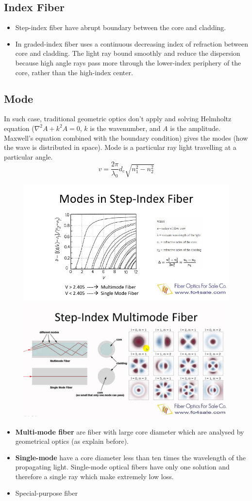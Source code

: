 \documentclass[twocolumn]{article}
\numberwithin{equation}{section}
\begin{document}
	\subsection{Index Fiber}
\begin{itemize}
	\item Step-index fiber have abrupt boundary between the core and cladding. 
	\item In graded-index fiber uses a continuous decreasing index of refraction between core and cladding. The light ray bound smoothly and reduce the dispersion because high angle rays pass more through the lower-index periphery of the core, rather than the high-index center.
\end{itemize}


	\subsection{Mode}
In such case, traditional geometric optics don't apply and solving Helmholtz equation ($\nabla^2 A + k^2 A = 0$,  $k$ is the wavenumber, and $A$ is the amplitude. Maxwell's equation combined with the boundary condition) gives the modes (how the wave is distributed in space).
Mode is a particular ray light travelling at a particular angle.
$$v=\frac{2\pi}{\lambda_0}d_c\sqrt{n_1^2-n_2^2}$$
\begin{figure}[H]
	\centering
	\includegraphics[width=.5\textwidth]{what-is-single-mode-and-multimode-fiber-4-728.jpg}
	\includegraphics[width=.5\textwidth]{maxresdefault.jpg}
\end{figure}

\begin{itemize}
	\item \textbf{Multi-mode fiber} are fiber with large core diameter which are analysed by geometrical optics (as explain before). 
	\item \textbf{Single-mode} have a core diameter less than ten times the wavelength of the propagating light.  Single-mode optical fibers have only one solution and therefore a single ray which make extremely low loss.
	\item Special-purpose fiber
\end{itemize}
\end{document}
